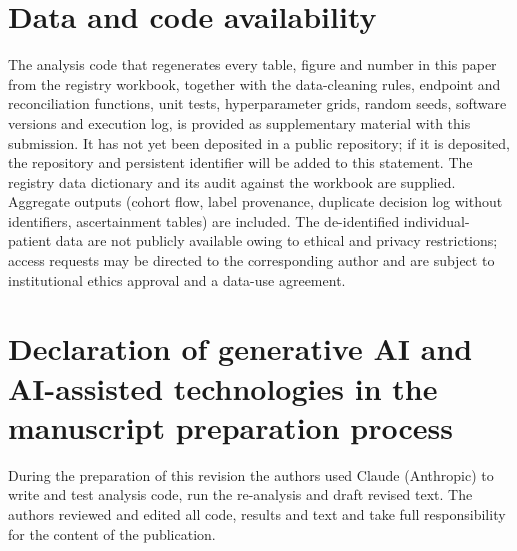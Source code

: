 \documentclass[preprint,10pt]{elsarticle}
\begin{document}
\section*{Data and code availability}
The analysis code that regenerates every table, figure and number in this paper from the registry workbook, together with the data-cleaning rules, endpoint and reconciliation functions, unit tests, hyperparameter grids, random seeds, software versions and execution log, is provided as supplementary material with this submission. It has not yet been deposited in a public repository; if it is deposited, the repository and persistent identifier will be added to this statement. The registry data dictionary and its audit against the workbook are supplied. Aggregate outputs (cohort flow, label provenance, duplicate decision log without identifiers, ascertainment tables) are included. The de-identified individual-patient data are not publicly available owing to ethical and privacy restrictions; access requests may be directed to the corresponding author and are subject to institutional ethics approval and a data-use agreement.

\section*{Declaration of generative AI and AI-assisted technologies in the manuscript preparation process}
During the preparation of this revision the authors used Claude (Anthropic) to write and test analysis code, run the re-analysis and draft revised text. The authors reviewed and edited all code, results and text and take full responsibility for the content of the publication.
\end{document}
